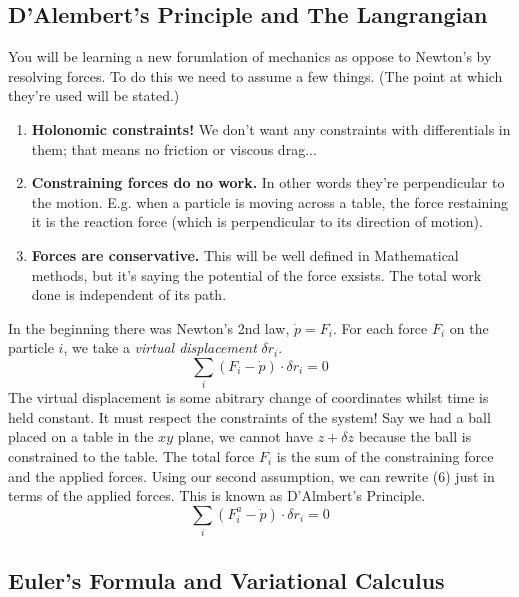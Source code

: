 \subsection{D'Alembert's Principle and The Langrangian}
You will be learning a new forumlation of mechanics as oppose to Newton's by resolving forces. To do this we need to assume a few things. (The point at which they're used will be stated.)
\begin{enumerate}
\item \textbf{Holonomic constraints!} We don't want any constraints with differentials in them; that means no friction or viscous drag...
\item \textbf{Constraining forces do no work.} In other words they're perpendicular to the motion. E.g. when a particle is moving across a table, the force restaining it is the reaction force (which is perpendicular to its direction of motion).
\item \textbf{Forces are conservative.} This will be well defined in Mathematical methods, but it's saying the potential of the force exsists. The total work done is independent of its path.
\end{enumerate}
\par 
In the beginning there was Newton's 2nd law, $\dot{p} = F_{i}$. For each force $F_{i}$ on the particle $i$, we take a \textit{virtual displacement} $\delta r_{i}$. 
\begin{equation}
\sum_{i} (F_{i} - \dot{p}) \cdot \delta r_{i} = 0
\end{equation}
The virtual displacement is some abitrary change of coordinates whilst time is held constant. It must respect the constraints of the system! Say we had a ball placed on a table in the $xy$ plane, we cannot have $z + \delta z$ because the ball is constrained to the table. The total force $F_{i}$ is the sum of the constraining force and the applied forces. Using our second assumption, we can rewrite (6) just in terms of the applied forces. This is known as D'Almbert's Principle.
\begin{equation}
\sum_{i} (F_{i}^{a} - \dot{p}) \cdot \delta r_{i} = 0
\end{equation}





























\subsection{Euler's Formula and Variational Calculus}